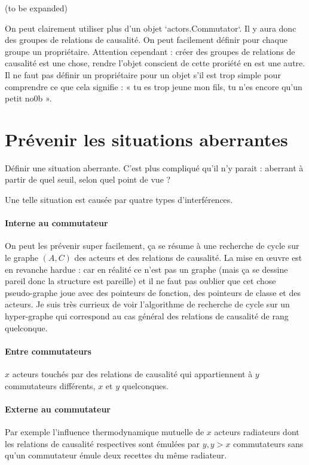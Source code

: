 \documentclass[11pt]{article}
\begin{document}
(to be expanded)

On peut clairement utiliser plus d'un objet `actors.Commutator`. Il y aura donc des groupes de relations de causalité. On peut facilement définir pour chaque groupe un propriétaire. Attention cependant : créer des groupes de relations de causalité est une chose, rendre l'objet conscient de cette proriété en est une autre. Il ne faut pas définir un propriétaire pour un objet s'il est trop simple pour comprendre ce que cela signifie : « tu es trop jeune mon fils, tu n'es encore qu'un petit no0b ».

\section{Prévenir les situations aberrantes}

Définir une situation aberrante. C'est plus compliqué qu'il n'y parait : aberrant à partir de quel seuil, selon quel point de vue ?

Une telle situation est causée par quatre types d'interférences.

\paragraph{Interne au commutateur} On peut les prévenir super facilement, ça se résume à une recherche de cycle sur le graphe $(A, C)$ des acteurs et des relations de causalité. La mise en œuvre est en revanche hardue : car en réalité ce n'est pas un graphe (mais ça se dessine pareil donc la structure est pareille) et il ne faut pas oublier que cet chose pseudo-graphe joue avec des pointeurs de fonction, des pointeurs de classe et des acteurs. Je suis très currieux de voir l'algorithme de recherche de cycle sur un hyper-graphe qui correspond au cas général des relations de causalité de rang quelconque.

\paragraph{Entre commutateurs} $x$ acteurs touchés par des relations de causalité qui appartiennent à $y$ commutateurs différents, $x$ et $y$ quelconques.

\paragraph{Externe au commutateur} Par exemple l'influence thermodynamique mutuelle de $x$ acteurs radiateurs dont les relations de causalité respectives sont émulées par $y, y > x$ commutateurs sans qu'un commutateur émule deux recettes du même radiateur.
\end{document}

